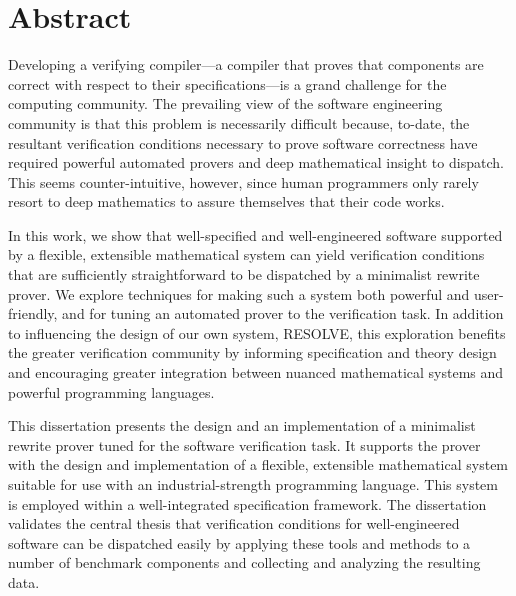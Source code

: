 \chapter*{Abstract}
Developing a verifying compiler---a compiler that proves that components are correct with respect to their specifications---is a grand challenge for the computing community.  The prevailing view of the software engineering community is that this problem is necessarily difficult because, to-date, the resultant verification conditions necessary to prove software correctness have required powerful automated provers and deep mathematical insight to dispatch.  This seems counter-intuitive, however, since human programmers only rarely resort to deep mathematics to assure themselves that their code works.

In this work, we show that well-specified and well-engineered software supported by a flexible, extensible mathematical system can yield verification conditions that are sufficiently straightforward to be dispatched by a minimalist rewrite prover.  We explore techniques for making such a system both powerful and user-friendly, and for tuning an automated prover to the verification task.  In addition to influencing the design of our own system, RESOLVE, this exploration benefits the greater verification community by informing specification and theory design and encouraging greater integration between nuanced mathematical systems and powerful programming languages.

This dissertation presents the design and an implementation of a minimalist rewrite prover tuned for the software verification task.  It supports the prover with the design and implementation of a flexible, extensible mathematical system suitable for use with an industrial-strength programming language.  This system is employed within a well-integrated specification framework.  The dissertation validates the central thesis that verification conditions for well-engineered software can be dispatched easily by applying these tools and methods to a number of benchmark components and collecting and analyzing the resulting data.
